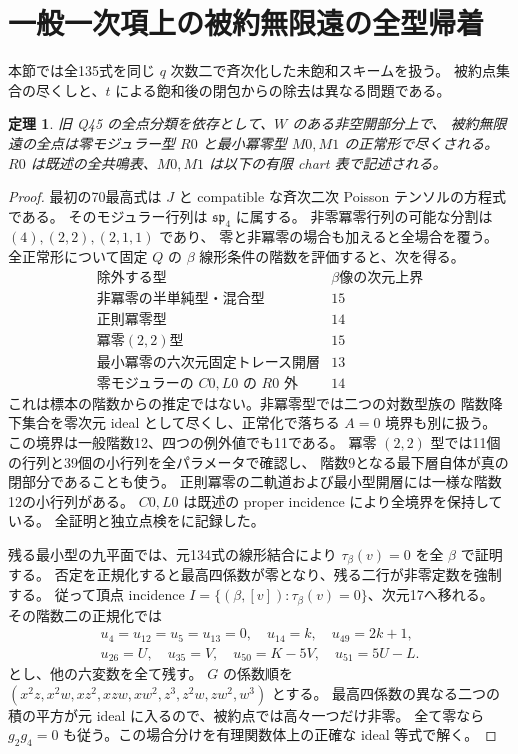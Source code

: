 \documentclass[11pt,a4paper]{ltjsarticle}
\newtheorem{theorem}{定理}[section]
\theoremstyle{remark}
\begin{document}
\section{一般一次項上の被約無限遠の全型帰着}
本節では全135式を同じ $q$ 次数二で斉次化した未飽和スキームを扱う。
被約点集合の尽くしと、$t$ による飽和後の閉包からの除去は異なる問題である。
\begin{theorem}\label{thm:all-infinity-v35}
旧 Q45 の全点分類を依存として、$W$ のある非空開部分上で、
被約無限遠の全点は零モジュラー型 $R0$ と最小冪零型 $M0,M1$ の正常形で尽くされる。
$R0$ は既述の全共鳴表、$M0,M1$ は以下の有限 chart 表で記述される。
\end{theorem}
\begin{proof}
最初の70最高式は $J$ と compatible な斉次二次 Poisson テンソルの方程式である。
そのモジュラー行列は $\mathfrak{sp}_4$ に属する。
非零冪零行列の可能な分割は $(4),(2,2),(2,1,1)$ であり、
零と非冪零の場合も加えると全場合を覆う。
全正常形について固定 $Q$ の $\beta$ 線形条件の階数を評価すると、次を得る。
\[
\begin{array}{c|c}
\text{除外する型}&\beta\text{像の次元上界}\\\hline
\text{非冪零の半単純型・混合型}&15\\
\text{正則冪零型}&14\\
\text{冪零}(2,2)\text{型}&15\\
\text{最小冪零の六次元固定トレース開層}&13\\
\text{零モジュラーの }C0,L0\text{ の }R0\text{ 外}&14
\end{array}
\]
これは標本の階数からの推定ではない。非冪零型では二つの対数型族の
階数降下集合を零次元 ideal として尽くし、正常化で落ちる $A=0$ 境界も別に扱う。
この境界は一般階数12、四つの例外値でも11である。
冪零 $(2,2)$ 型では11個の行列と39個の小行列を全パラメータで確認し、
階数9となる最下層自体が真の閉部分であることも使う。
正則冪零の二軌道および最小型開層には一様な階数12の小行列がある。
$C0,L0$ は既述の proper incidence により全境界を保持している。
全証明と独立点検を\cite{all-infinity-v35}に記録した。

残る最小型の九平面では、元134式の線形結合により
$\tau_\beta(v)=0$ を全 $\beta$ で証明する。
否定を正規化すると最高四係数が零となり、残る二行が非零定数を強制する。
従って頂点 incidence $I=\{(\beta,[v]):\tau_\beta(v)=0\}$、次元17へ移れる。
その階数二の正規化では
\[
 \begin{gathered}
 u_4=u_{12}=u_5=u_{13}=0,\quad u_{14}=k,\quad u_{49}=2k+1,\\
 u_{26}=U,\quad u_{35}=V,\quad u_{50}=K-5V,\quad u_{51}=5U-L.
 \end{gathered}
\]
とし、他の六変数を全て残す。
$G$ の係数順を $(x^2z,x^2w,xz^2,xzw,xw^2,z^3,z^2w,zw^2,w^3)$ とする。
最高四係数の異なる二つの積の平方が元 ideal に入るので、被約点では高々一つだけ非零。
全て零なら $g_2g_4=0$ も従う。この場合分けを有理関数体上の正確な ideal 等式で解く。


\end{proof}
\end{document}
